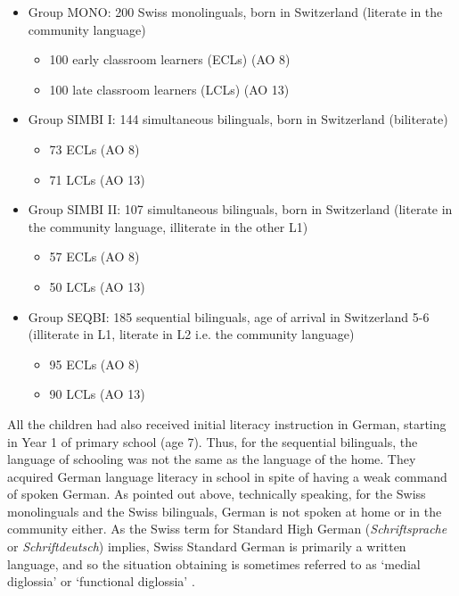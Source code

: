 \documentclass[output=paper,modfonts,nonflat,newtxmath]{langsci/langscibook}
\begin{document}
\begin{itemize}
\item
Group MONO: 200 Swiss monolinguals, born in Switzerland (literate in the community language)


\begin{itemize}
\item
100 early classroom learners (ECLs) (AO 8)

\item
100 late classroom learners (LCLs) (AO 13)

\end{itemize}
\item
Group SIMBI I: 144 simultaneous bilinguals, born in Switzerland (biliterate)


\begin{itemize}
\item
73 ECLs (AO 8)

\item
71 LCLs (AO 13)

\end{itemize}
\item
Group SIMBI II: 107 simultaneous bilinguals, born in Switzerland (literate in the community language, illiterate in the other L1)


\begin{itemize}
\item
57 ECLs (AO 8)

\item
50 LCLs (AO 13)

\end{itemize}
\item
Group SEQBI: 185 sequential bilinguals, age of arrival in Switzerland 5-6 (illiterate in L1, literate in L2 i.e. the community language)


\begin{itemize}
\item
95 ECLs (AO 8)

\item
90 LCLs (AO 13)

\end{itemize}
\end{itemize}

All the children had also received initial literacy instruction in German, starting in Year 1 of primary school (age 7). Thus, for the sequential bilinguals, the language of schooling was not the same as the language of the home. They acquired German language literacy in school in spite of having a weak command of spoken German. As pointed out above, technically speaking, for the Swiss monolinguals and the Swiss bilinguals, German is not spoken at home or in the community either. As the Swiss term for Standard High German (\textit{Schriftsprache} or \textit{Schriftdeutsch}) implies, Swiss Standard German is primarily a written language, and so the situation obtaining is sometimes referred to as ‘medial diglossia’ \citep{Kolde1981} or ‘functional diglossia’ \citep{Rash1998}.
\end{document}
